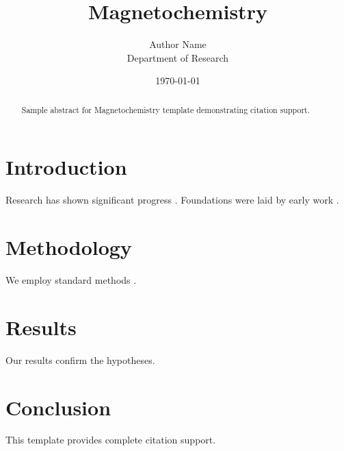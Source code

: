 \documentclass{mdpi}
\title{Magnetochemistry}
\author{Author Name \\ \small Department of Research}
\date{\today}
\begin{document}
\maketitle

\begin{abstract}
Sample abstract for Magnetochemistry template demonstrating citation support.
\end{abstract}

\section{Introduction}
Research has shown significant progress \citep{einstein1905}. Foundations were laid by early work \citep{turing1950}.

\section{Methodology}
We employ standard methods \citep{knuth1984}.

\section{Results}
Our results confirm the hypotheses.

\section{Conclusion}
This template provides complete citation support.



\end{document}
